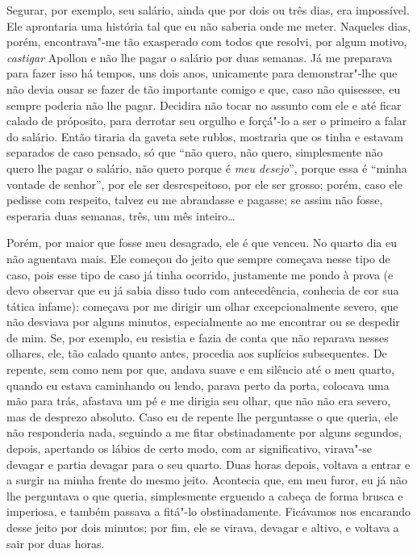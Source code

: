 Segurar, por exemplo, seu salário, ainda que por dois ou três dias, era
impossível. Ele aprontaria uma história tal que eu não saberia onde me
meter. Naqueles dias, porém, encontrava"-me tão exasperado com todos que
resolvi, por algum motivo, \emph{castigar} Apollon e não lhe pagar o
salário por duas semanas. Já me preparava para fazer isso há tempos, uns
dois anos, unicamente para demonstrar"-lhe que não devia ousar se fazer
de tão importante comigo e que, caso não quisessee, eu sempre poderia
não lhe pagar. Decidira não tocar no assunto com ele e até ficar calado
de próposito, para derrotar seu orgulho e forçá"-lo a ser o primeiro a
falar do salário. Então tiraria da gaveta sete rublos, mostraria que os
tinha e estavam separados de caso pensado, só que ``não quero, não
quero, simplesmente não quero lhe pagar o salário, não quero porque é
\emph{meu desejo}'', porque essa é ``minha vontade de senhor'', por ele
ser desrespeitoso, por ele ser grosso; porém, caso ele pedisse com
respeito, talvez eu me abrandasse e pagasse; se assim não fosse,
esperaria duas semanas, três, um mês inteiro\ldots{}

Porém, por maior que fosse meu desagrado, ele é que venceu. No quarto
dia eu não aguentava mais. Ele começou do jeito que sempre começava
nesse tipo de caso, pois esse tipo de caso já tinha ocorrido, justamente
me pondo à prova (e devo observar que eu já sabia disso tudo com
antecedência, conhecia de cor sua tática infame): começava por me
dirigir um olhar excepcionalmente severo, que não desviava por alguns
minutos, especialmente ao me encontrar ou se despedir de mim. Se, por
exemplo, eu resistia e fazia de conta que não reparava nesses olhares,
ele, tão calado quanto antes, procedia aos suplícios subsequentes. De
repente, sem como nem por que, andava suave e em silêncio até o meu
quarto, quando eu estava caminhando ou lendo, parava perto da porta,
colocava uma mão para trás, afastava um pé e me dirigia seu olhar, que
não não era severo, mas de desprezo absoluto. Caso eu de repente lhe
perguntasse o que queria, ele não responderia nada, seguindo a me fitar
obstinadamente por alguns segundos, depois, apertando os lábios de certo
modo, com ar significativo, virava"-se devagar e partia devagar para o
seu quarto. Duas horas depois, voltava a entrar e a surgir na minha
frente do mesmo jeito. Acontecia que, em meu furor, eu já não lhe
perguntava o que queria, simplesmente erguendo a cabeça de forma brusca
e imperiosa, e também passava a fitá"-lo obstinadamente. Ficávamos nos
encarando desse jeito por dois minutos; por fim, ele se virava, devagar
e altivo, e voltava a sair por duas horas.

